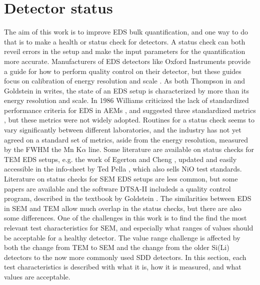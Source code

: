 

\clearpage

\section{Detector status}
\label{theory:qc}


The aim of this work is to improve EDS bulk quantification, and one way to do that is to make a health or status check for detectors.
A status check can both reveil errors in the setup and make the input parameters for the quantification more accurate.
Manufacturers of EDS detectors like Oxford Instruments provide a guide for how to perform quality control on their detector, but these guides focus on calibration of energy resolution and scale \cite{aztec_manual}.
As both Thompson in \cite{keith_energy_res_2013} and Goldstein in \cite{goldstein_scanning_2018} writes, the state of an EDS setup is characterized by more than its energy resolution and scale.
In 1986 Williams criticized the lack of standardized performance criteria for EDS in AEMs , and suggested three standardized metrics \cite{williams_standard_definitions_1986}, but these metrics were not widely adopted.
Routines for a status check seems to vary significantly between different laboratories, and the industry has not yet agreed on a standard set of metrics, aside from the energy resolution, measured by the FWHM the Mn K$\alpha$ line.
Some literature are available on status checks for TEM EDS setups, e.g. the work of Egerton and Cheng \cite{egerton_eds_1994}, updated and easily accessible in the info-sheet by Ted Pella \cite{ted_pella_nio_tem_2019}, which also sells NiO test standards.
Literature on status checks for SEM EDS setups are less common, but some papers are available and the software DTSA-II \cite{software_dtsaii} includeds a quality control program, described in the textbook by Goldstein \cite{goldstein_scanning_2018}.
The similarities between EDS in SEM and TEM allow much overlap in the status checks, but there are also some differences.
One of the challenges in this work is to find the find the most relevant test characteristics for SEM, and especially what ranges of values should be acceptable for a healthy detector.
The value range challenge is affected by both the change from TEM to SEM and the change from the older Si(Li) detectors to the now more commonly used SDD detectors.
In this section, each test characteristics is described with what it is, how it is measured, and what values are acceptable.

